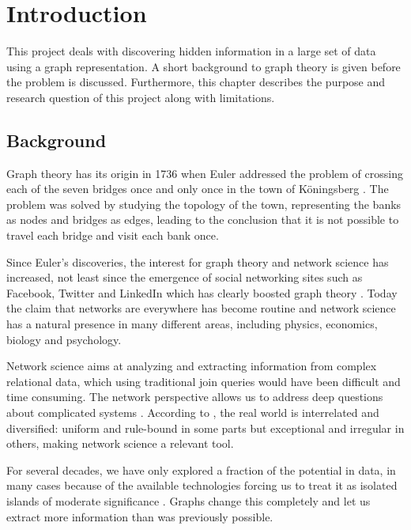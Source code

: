 \chapter{Introduction}
This project deals with discovering hidden information in a large set of data using a graph representation. A short background to graph theory is given before the problem is discussed. Furthermore, this chapter describes the purpose and research question of this project along with limitations. 

\section{Background}
Graph theory has its origin in 1736 when Euler addressed the problem of crossing each of the seven bridges once and only once in the town of Köningsberg \cite{fouss2016algorithms}. The problem was solved by studying the topology of the town, representing the banks as nodes and bridges as edges, leading to the conclusion that it is not possible to travel each bridge and visit each bank once.

Since Euler's discoveries, the interest for graph theory and network science has increased, not least since the emergence of social networking sites such as Facebook, Twitter and LinkedIn which has clearly boosted graph theory \cite{fouss2016algorithms,barabasi2016network}. Today the claim that networks are everywhere has become routine \cite{brandes2013} and network science has a natural presence in many different areas, including physics, economics, biology and psychology.

Network science aims at analyzing and extracting information from complex relational data, which using traditional join queries would have been difficult and time consuming. The network perspective allows us to address deep questions about complicated systems \cite{brandes2013}. According to \citet{robinson2013}, the real world is interrelated and diversified: uniform and rule-bound in some parts but exceptional and irregular in others, making network science a relevant tool.

For several decades, we have only explored a fraction of the potential in data, in many cases because of the available technologies forcing us to treat it as isolated islands of moderate significance \cite{robinson2013}. Graphs change this completely and let us extract more information than was previously possible.


